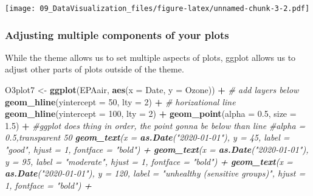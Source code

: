\documentclass[]{article}
\newenvironment{Shaded}{\begin{snugshade}}{\end{snugshade}}
\newcommand{\CommentTok}[1]{\textcolor[rgb]{0.56,0.35,0.01}{\textit{#1}}}
\newcommand{\DataTypeTok}[1]{\textcolor[rgb]{0.13,0.29,0.53}{#1}}
\newcommand{\DecValTok}[1]{\textcolor[rgb]{0.00,0.00,0.81}{#1}}
\newcommand{\FloatTok}[1]{\textcolor[rgb]{0.00,0.00,0.81}{#1}}
\newcommand{\KeywordTok}[1]{\textcolor[rgb]{0.13,0.29,0.53}{\textbf{#1}}}
\newcommand{\NormalTok}[1]{#1}
\newcommand{\OperatorTok}[1]{\textcolor[rgb]{0.81,0.36,0.00}{\textbf{#1}}}
\newcommand{\StringTok}[1]{\textcolor[rgb]{0.31,0.60,0.02}{#1}}
\begin{document}
\texttt{[image: 09\_DataVisualization\_files/figure-latex/unnamed-chunk-3-2.pdf]}

\hypertarget{adjusting-multiple-components-of-your-plots}{%
\subsubsection{Adjusting multiple components of your
plots}\label{adjusting-multiple-components-of-your-plots}}

While the theme allows us to set multiple aspects of plots, ggplot
allows us to adjust other parts of plots outside of the theme.

\begin{Shaded}
\begin{Highlighting}[]
\NormalTok{O3plot7 <-}\StringTok{ }\KeywordTok{ggplot}\NormalTok{(EPAair, }\KeywordTok{aes}\NormalTok{(}\DataTypeTok{x =}\NormalTok{ Date, }\DataTypeTok{y =}\NormalTok{ Ozone)) }\OperatorTok{+}\StringTok{ }\CommentTok{# add layers below}
\StringTok{  }\KeywordTok{geom_hline}\NormalTok{(}\DataTypeTok{yintercept =} \DecValTok{50}\NormalTok{, }\DataTypeTok{lty =} \DecValTok{2}\NormalTok{) }\OperatorTok{+}\StringTok{   }\CommentTok{# horizational line}
\StringTok{  }\KeywordTok{geom_hline}\NormalTok{(}\DataTypeTok{yintercept =} \DecValTok{100}\NormalTok{, }\DataTypeTok{lty =} \DecValTok{2}\NormalTok{) }\OperatorTok{+}
\StringTok{  }\KeywordTok{geom_point}\NormalTok{(}\DataTypeTok{alpha =} \FloatTok{0.5}\NormalTok{, }\DataTypeTok{size =} \FloatTok{1.5}\NormalTok{) }\OperatorTok{+}\StringTok{ }\CommentTok{#ggplot does thing in order, the point gonna be below than line}
\StringTok{                                        }\CommentTok{#alpha = 0.5,transparent 50%}
\StringTok{  }\KeywordTok{geom_text}\NormalTok{(}\DataTypeTok{x =} \KeywordTok{as.Date}\NormalTok{(}\StringTok{"2020-01-01"}\NormalTok{), }\DataTypeTok{y =} \DecValTok{45}\NormalTok{, }\DataTypeTok{label =} \StringTok{"good"}\NormalTok{, }\DataTypeTok{hjust =} \DecValTok{1}\NormalTok{, }\DataTypeTok{fontface =} \StringTok{"bold"}\NormalTok{) }\OperatorTok{+}
\StringTok{  }\KeywordTok{geom_text}\NormalTok{(}\DataTypeTok{x =} \KeywordTok{as.Date}\NormalTok{(}\StringTok{"2020-01-01"}\NormalTok{), }\DataTypeTok{y =} \DecValTok{95}\NormalTok{, }\DataTypeTok{label =} \StringTok{"moderate"}\NormalTok{, }\DataTypeTok{hjust =} \DecValTok{1}\NormalTok{, }\DataTypeTok{fontface =} \StringTok{"bold"}\NormalTok{) }\OperatorTok{+}
\StringTok{  }\KeywordTok{geom_text}\NormalTok{(}\DataTypeTok{x =} \KeywordTok{as.Date}\NormalTok{(}\StringTok{"2020-01-01"}\NormalTok{), }\DataTypeTok{y =} \DecValTok{120}\NormalTok{, }\DataTypeTok{label =} \StringTok{"unhealthy (sensitive groups)"}\NormalTok{, }\DataTypeTok{hjust =} \DecValTok{1}\NormalTok{, }\DataTypeTok{fontface =} \StringTok{"bold"}\NormalTok{) }\OperatorTok{+}
}
\end{Highlighting}
\end{Shaded}
\end{document}
